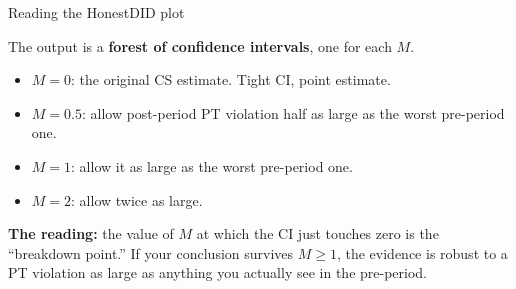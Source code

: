 \documentclass[aspectratio=169,12pt,t]{beamer}
\begin{document}
\begin{frame}{Reading the HonestDID plot}
\vspace{0.4cm}

The output is a \textbf{forest of confidence intervals}, one for each $M$.

\vspace{0.4cm}
\begin{itemize}\setlength\itemsep{3pt}
  \item $M = 0$: \;the original CS estimate. \;Tight CI, point estimate.
  \item $M = 0.5$: \;allow post-period PT violation half as large as the worst pre-period one.
  \item $M = 1$: \;allow it as large as the worst pre-period one.
  \item $M = 2$: \;allow twice as large.
\end{itemize}

\vspace{0.4cm}

\textbf{The reading:} \;the value of $M$ at which the CI just touches zero is the ``breakdown point.'' \;If your conclusion survives $M \geq 1$, the evidence is robust to a PT violation as large as anything you actually see in the pre-period.

\vspace{0.4em}
\end{frame}
\end{document}
